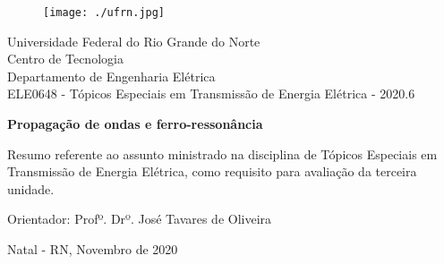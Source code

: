 \begin{titlepage}
	\begin{center}
	
	\begin{figure}[!ht]
	\centering
	\texttt{[image: ./ufrn.jpg]}
	\end{figure}

		Universidade Federal do Rio Grande do Norte \\ Centro de Tecnologia \\ Departamento de Engenharia Elétrica \\  ELE0648 - Tópicos Especiais em Transmissão de Energia Elétrica  - 2020.6 \\
\vspace{15pt}
        
        \vspace{85pt}
        
		\textbf{\Large{Propagação de ondas e ferro-ressonância}}\\
			
	\end{center}
\vspace{1,5cm}
	
	\begin{flushright}

   \begin{list}{}{
      \setlength{\leftmargin}{4.5cm}
      \setlength{\rightmargin}{0cm}
      \setlength{\labelwidth}{0pt}
      \setlength{\labelsep}{\leftmargin}}

      \item Resumo referente ao assunto ministrado na disciplina de Tópicos Especiais em Transmissão de Energia Elétrica, como requisito para avaliação da terceira unidade.

      \begin{list}{}{
      \setlength{\leftmargin}{0cm}
      \setlength{\rightmargin}{0cm}
      \setlength{\labelwidth}{0pt}
      \setlength{\labelsep}{\leftmargin}}


            \item Orientador: Profº. Drº. José Tavares de Oliveira

      \end{list}
   \end{list}
\end{flushright}
\vspace{1cm}
\begin{center}
		\vspace{\fill}
		 Natal - RN, Novembro de 2020
			\end{center}
\end{titlepage}
\newpage